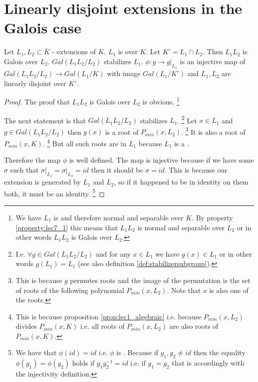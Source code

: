 \section{Linearly disjoint extensions in the Galois case}

\begin{theorem}
  Let $L_1, L_2 \subset \bar{K}$ - extensions of $K$. $L_1$ is
  over $K$. Let $K' = L_1 \cap L_2$. Then $L_1 L_2$ is Galois over
  $L_2$.
  $Gal\left(L_1 L_2/ L_2\right)$ stabilizes $L_1$. $\phi: g \to
  \left.g\right|_{L_1}$ is an injective map of
  $Gal\left(L_1 L_2/ L_2\right) \to Gal\left(L_1/ K\right)$ with
  image $Gal\left(L_1/K'\right)$ and $L_1, L_2$ are linearly disjoint
  over $K'$.
  \label{thm:lec7_3}
  \begin{proof}
    The proof that $L_1 L_2$ is Galois over $L_2$ is obvious.
    \footnote{
      We have $L_1$ is  and therefore
      normal and separable over $K$. By property \ref{property:lec7_1}
      this means that $L_1 L_2$ is normal and separable over $L_2$ or in
      other words $L_1 L_2$ is Galois over $L_2$.
    }

    The next statement is that $Gal\left(L_1 L_2/ L_2\right)$
    stabilizes
    $L_1$.
    \footnote{
      I.e. $\forall g \in Gal\left(L_1 L_2/ L_2\right)$  and for
      any $x \in L_1$ we have $g(x) \in L_1$ or in other words $g(L_1)
      = L_1$ (see also definition \ref{def:stabilizersubgroup}).
    }
    Let $x \in L_1$ and $g \in Gal\left(L_1 L_2/
    L_2\right)$ then 
    $g\left(x\right)$ is a root of $P_{min}\left(x, L_2\right)$.
    \footnote{
      This is because $g$ permutes roots and the image of the
      permutation is the set of roots of the following polynomial
      $P_{min}\left(x, L_2\right)$. Note that $x$ is also one of the
      roots.  
    }
    It is
    also a root of $P_{min}\left(x, K\right)$.
    \footnote{
      This is because proposition \ref{prop:lec1_algebraic} i.e. because
       $P_{min}\left(x, L_2\right)$ divides  $P_{min}\left(x,
      K\right)$ i.e. all roots of $P_{min}\left(x, L_2\right)$ are
      also roots of $P_{min}\left(x, K\right)$.
    }
    But all such roots are
    in $L_1$ because $L_1$ is a . 

    Therefore the map $\phi$ is well
    defined. The map is injective because if we have some $\sigma$ such that
    $\left. \sigma \right|_{L_1} = \left. \sigma \right|_{L_2} = id$
    then it should be $\sigma = id$.
    This is because our extension is
    generated by $L_1$ and $L_2$, so if it happened to be in identity
    on them both, it must be an identity.
    \footnote{
      \label{note:lec7_injectivity}
      We have that $\phi(id) = id$ i.e. $\phi$ is
      . Because if $g_1, g_2 \ne id$ then
      the equality $\phi(g_1) = \phi(g_2)$ holds if $g_1 g_2^{-1} =
      id$ i.e. if $g_1 = g_2$ that is accordingly with the injectivity
      definition.

}
\end{proof}
\end{theorem}
